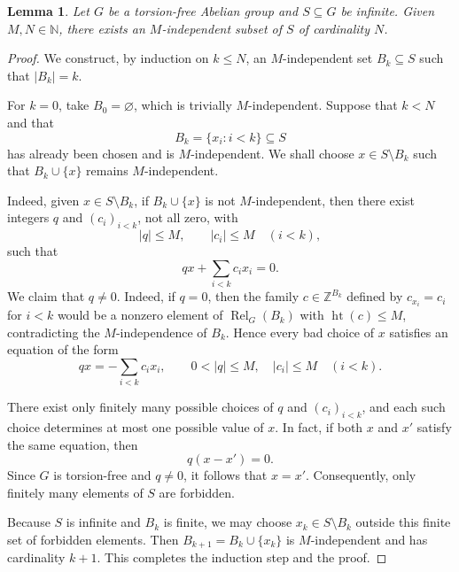 \documentclass[11pt]{amsart}
\newtheorem{lemma}[theorem]{Lemma}
\theoremstyle{definition}
\newcommand{\N}{\mathbb N}
\newcommand{\Z}{\mathbb Z}
\newcommand{\Rel}{\operatorname{Rel}}
\newcommand{\htop}{\operatorname{ht}}
\begin{document}
\begin{lemma}\label{lem:finite-extraction}
Let $G$ be a torsion-free Abelian group and $S\subseteq G$ be infinite.
Given $M,N\in\N$,
there exists an $M$-independent subset of $S$ of cardinality $N$.
\end{lemma}

\begin{proof}
We construct, by induction on $k\leq N$, an $M$-independent set
$B_k\subseteq S$ such that $|B_k|=k$.

For $k=0$, take $B_0=\varnothing$, which is trivially
$M$-independent.  Suppose that $k<N$ and that
\[
B_k=\{x_i:i<k\}\subseteq S
\]
has already been chosen and is $M$-independent. We shall choose
$x\in S\setminus B_k$ such that $B_k\cup\{x\}$ remains
$M$-independent.

Indeed, given $x\in S\setminus B_k$, if $B_k\cup\{x\}$ is not
$M$-independent, then there exist integers $q$ and $(c_i)_{i<k}$, not all
zero, with
\[
|q|\leq M,\qquad |c_i|\leq M\quad(i<k),
\]
such that
\[
qx+\sum_{i<k} c_i x_i=0.
\]
We claim that $q\neq0$. Indeed, if $q=0$, then the family
$c\in\Z^{B_k}$ defined by $c_{x_i}=c_i$ for $i<k$ would be a nonzero
element of $\Rel_G(B_k)$ with $\htop(c)\leq M$, contradicting the
$M$-independence of $B_k$. Hence every bad
choice of $x$ satisfies an equation of the form
\[
qx=-\sum_{i<k} c_i x_i,
\qquad
0<|q|\leq M,\quad |c_i|\leq M\quad(i<k).
\]

There exist only finitely many possible choices of $q$ and $(c_i)_{i<k}$,
and each such choice determines at most one possible value of $x$.
In fact, if both $x$ and $x'$ satisfy the same equation, then
\[
q(x-x')=0.
\]
Since $G$ is torsion-free and $q\neq0$, it follows that $x=x'$.
Consequently, only finitely many elements of $S$ are forbidden.

Because $S$ is infinite and $B_k$ is finite, we may choose
$x_k\in S\setminus B_k$ outside this finite set of forbidden elements.
Then $B_{k+1}=B_k\cup\{x_k\}$ is $M$-independent and has cardinality
$k+1$.  This completes the induction step and the proof.

\end{proof}
\end{document}
